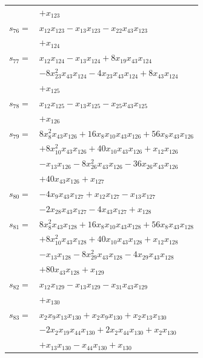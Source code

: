 \begin{longtable}{@{}r@{\;}l@{}}
 & \(\displaystyle +x_{123}\) \\[3pt]
\(s_{76}=\) & \(\displaystyle x_{12}x_{123} -x_{13}x_{123} -x_{22}x_{43}x_{123}\) \\
 & \(\displaystyle +x_{124}\) \\[3pt]
\(s_{77}=\) & \(\displaystyle x_{12}x_{124} -x_{13}x_{124} +8x_{19}x_{43}x_{124}\) \\
 & \(\displaystyle -8x_{23}^{2}x_{43}x_{124} -4x_{23}x_{43}x_{124} +8x_{43}x_{124}\) \\
 & \(\displaystyle +x_{125}\) \\[3pt]
\(s_{78}=\) & \(\displaystyle x_{12}x_{125} -x_{13}x_{125} -x_{25}x_{43}x_{125}\) \\
 & \(\displaystyle +x_{126}\) \\[3pt]
\(s_{79}=\) & \(\displaystyle 8x_{8}^{2}x_{43}x_{126} +16x_{8}x_{10}x_{43}x_{126} +56x_{8}x_{43}x_{126}\) \\
 & \(\displaystyle +8x_{10}^{2}x_{43}x_{126} +40x_{10}x_{43}x_{126} +x_{12}x_{126}\) \\
 & \(\displaystyle -x_{13}x_{126} -8x_{26}^{2}x_{43}x_{126} -36x_{26}x_{43}x_{126}\) \\
 & \(\displaystyle +40x_{43}x_{126} +x_{127}\) \\[3pt]
\(s_{80}=\) & \(\displaystyle -4x_{9}x_{43}x_{127} +x_{12}x_{127} -x_{13}x_{127}\) \\
 & \(\displaystyle -2x_{28}x_{43}x_{127} -4x_{43}x_{127} +x_{128}\) \\[3pt]
\(s_{81}=\) & \(\displaystyle 8x_{8}^{2}x_{43}x_{128} +16x_{8}x_{10}x_{43}x_{128} +56x_{8}x_{43}x_{128}\) \\
 & \(\displaystyle +8x_{10}^{2}x_{43}x_{128} +40x_{10}x_{43}x_{128} +x_{12}x_{128}\) \\
 & \(\displaystyle -x_{13}x_{128} -8x_{29}^{2}x_{43}x_{128} -4x_{29}x_{43}x_{128}\) \\
 & \(\displaystyle +80x_{43}x_{128} +x_{129}\) \\[3pt]
\(s_{82}=\) & \(\displaystyle x_{12}x_{129} -x_{13}x_{129} -x_{31}x_{43}x_{129}\) \\
 & \(\displaystyle +x_{130}\) \\[3pt]
\(s_{83}=\) & \(\displaystyle x_{2}x_{9}x_{13}x_{130} +x_{2}x_{9}x_{130} +x_{2}x_{13}x_{130}\) \\
 & \(\displaystyle -2x_{2}x_{19}x_{44}x_{130} +2x_{2}x_{44}x_{130} +x_{2}x_{130}\) \\
 & \(\displaystyle +x_{13}x_{130} -x_{44}x_{130} +x_{130}\) \\

\end{longtable}
